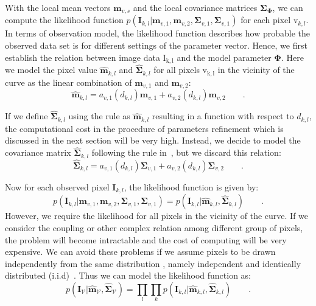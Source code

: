 With the local mean vectors $\mathbf{m}_{v,s}$  and the local covariance matrices
$\mathbf{\Sigma}_{\mathbf{\Phi}}$, we can compute the
likelihood function   $p(\mathbf{I}_{k,l} | \mathbf{m}_{v,1}, \mathbf{m}_{v,2},
  \mathbf{\Sigma}_{v,1}, \mathbf{\Sigma}_{v,1})$ for each pixel
  $\mathrm{v}_{k,l}$. In terms of observation model, the likelihood
  function describes how probable the observed data set is for
  different settings of the parameter vector. Hence, we first establish
  the relation between image data $\mathrm{I_{k,l}}$ and the model
  parameter $\mathbf{\Phi}$. Here we model the pixel value
  $\hat{\mathbf{m}}_{k,l}$ and $\hat{\mathbf{\Sigma}}_{k,l}$
  for all pixels $\mathrm{v_{k,l}}$ in the vicinity of the curve as the
  linear combination of $\mathbf{m}_{v,1}$ and $\mathbf{m}_{v,2}$:
  \begin{equation}
    \label{eq:meankl}
    \hat{\mathbf{m}}_{k,l} = a_{v,1}(d_{k,l})\mathbf{m}_{v,1} + a_{v,2}(d_{k,l})\mathbf{m}_{v,2}\qquad.
  \end{equation}

If we define  $\hat{\mathbf{\Sigma}}_{k,l}$ using the rule as
$\hat{\mathbf{m}}_{k,l}$ resulting in a function with respect to $d_{k,l}$, the computational cost in the procedure of
parameters refinement which is discussed in the next section  will be very high. Instead, we decide to
model the covariance matrix $\hat{\mathbf{\Sigma}}_{k,l}$ following the
rule in~\cite{hanek2004fitting}, but we discard this relation:
\begin{equation}
  \label{eq:sigmakl}
  \hat{\mathbf{\mathbf{\Sigma}}}_{k,l} = a_{v,1}(d_{k,l})\mathbf{\Sigma}_{v,1} + a_{v,2}(d_{k,l})\mathbf{\Sigma}_{v,2}\qquad.
\end{equation}

Now for each observed pixel $\mathbf{I}_{k,l}$, the likelihood
function is given by:
\begin{equation}
  \label{eq:likelihood}
p(\mathbf{I}_{k,l} | \mathbf{m}_{v,1}, \mathbf{m}_{v,2},
  \mathbf{\Sigma}_{v,1}, \mathbf{\Sigma}_{v,1}) = p(\mathbf{I}_{k,l} | \hat{\mathbf{\mathbf{m}}}_{k,l},\hat{\mathbf{\mathbf{\Sigma}}}_{k,l}) \qquad.
\end{equation}
However, we require the likelihood for all pixels in the vicinity of
the curve. If we consider the coupling or other complex relation among
different group of pixels, the problem will become intractable and the cost of computing will be very expensive. We can
avoid these problems if we assume pixels to be drawn independently from the same distribution
, namely independent and identically distributed
(i.i.d)~\cite{bishop2006pattern}. Thus we can model the likelihood function as:
\begin{equation}
  \label{eq:liklihoodall}
  p(\mathbf{I}_{\mathcal{V}} |
  \hat{\mathbf{\mathbf{m}}}_{\mathcal{V}},\hat{\mathbf{\mathbf{\Sigma}}}_{\mathcal{V}})
  = \prod_l \prod_k p(\mathbf{I}_{k,l} | \hat{\mathbf{\mathbf{m}}}_{k,l},\hat{\mathbf{\mathbf{\Sigma}}}_{k,l}) \qquad.
\end{equation}

